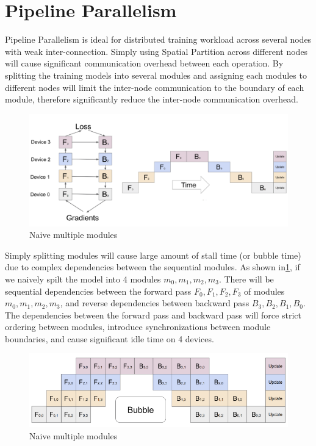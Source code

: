 \documentclass[sigplan]{acmart}\settopmatter{printfolios=true,printccs=false,printacmref=false}
\begin{document}
 \section{Pipeline Parallelism}
 Pipeline Parallelism is ideal for distributed training workload across several nodes with weak inter-connection. Simply using Spatial Partition across different nodes will cause significant communication overhead between each operation. By splitting the training models into several modules and assigning each modules to different nodes will limit the inter-node communication to the boundary of each module, therefore significantly reduce the inter-node communication overhead.\par
 \begin{figure}[htbp]
  \centering
  \includegraphics[scale=0.5]{NormalPipeline}
  \caption{Naive multiple modules}
  \label{fig:multiplemodule}
\end{figure}
 Simply splitting modules will cause large amount of stall time (or bubble time) due to complex dependencies between the sequential modules. As shown in\ref{fig:multiplemodule}, if we naively spilt the model into 4 modules $m_0,m_1,m_2,m_3$. There will be sequential dependencies between the forward pass $F_0, F_1, F_2, F_3$ of modules $m_0,m_1,m_2,m_3$, and reverse dependencies between backward pass $B_3, B_2, B_1, B_0$. The dependencies between the forward pass and backward pass will force strict ordering between modules, introduce synchronizations between module boundaries, and cause significant idle time on 4 devices. \par
 \begin{figure}[htbp]
  \centering
  \includegraphics[scale=0.7]{stackedpipeline}
  \caption{Naive multiple modules}
  \label{fig:stackedpipeline}
\end{figure}
\end{document}
